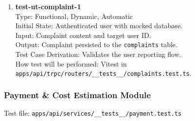 \documentclass[12pt, titlepage]{article}
\begin{document}
\begin{enumerate}
\item \textbf{test-ut-complaint-1}\\
Type: Functional, Dynamic, Automatic\\
Initial State: Authenticated user with mocked database.\\
Input: Complaint content and target user ID.\\
Output: Complaint persisted to the \texttt{complaints} table.\\
Test Case Derivation: Validates the user reporting flow.\\
How test will be performed: Vitest in \texttt{apps/api/trpc/routers/\_\_tests\_\_/complaints.test.ts}.\\
\end{enumerate}

\subsubsection{Payment \& Cost Estimation Module}

Test file: \texttt{apps/api/services/\_\_tests\_\_/payment.test.ts}
\end{document}
